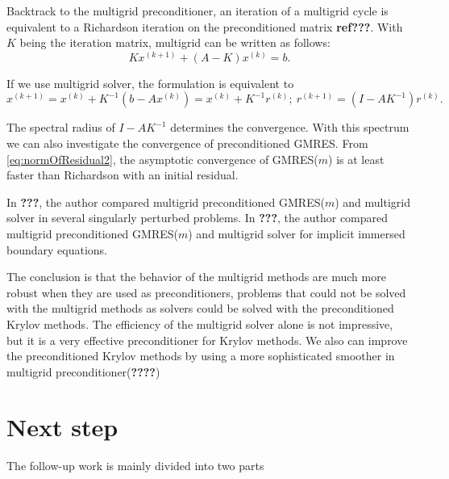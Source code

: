 Backtrack to the multigrid preconditioner, an iteration of a multigrid
cycle is equivalent to a Richardson iteration on  the preconditioned
matrix \textbf{ref???}. With $K$ being the iteration matrix, multigrid
can be written as follows:
\begin{equation}
  \label{eq:RichardsonIter}
  Kx^{(k+1)}+(A-K)x^{(k)}=b.
\end{equation}

If we use multigrid solver, the formulation is equivalent to
\begin{equation}
  \label{eq:Richardson2}
  x^{(k+1)} = x^{(k)} + K^{-1}(b-Ax^{(k)}) = x^{(k)}+K^{-1}r^{(k)};\
  r^{(k+1)} = (I-AK^{-1})r^{(k)}.
\end{equation}

The spectral radius of $I-AK^{-1}$ determines the convergence. With
this spectrum we can also investigate the convergence of
preconditioned GMRES. From \eqref{eq:normOfResidual2}, the asymptotic
convergence of GMRES($m$) is at least faster than Richardson with an initial
residual.

In \textbf{???}, the author compared multigrid preconditioned
GMRES($m$) and multigrid solver in several singularly perturbed
problems. In \textbf{???}, the author compared multigrid
preconditioned GMRES($m$) and multigrid solver for implicit immersed
boundary equations.

The conclusion is that the behavior of the multigrid methods
are much more robust when they are used as preconditioners, problems
that could not be solved with the multigrid methods as solvers could
be solved with the preconditioned Krylov methods. The efficiency of
the multigrid solver alone is not impressive, but it is a very
effective preconditioner for Krylov methods. We also can improve the
preconditioned Krylov methods by using a more sophisticated smoother
in multigrid preconditioner(\textbf{????})

\section{Next step}
\label{sec:goal}

The follow-up work is mainly divided into two parts



